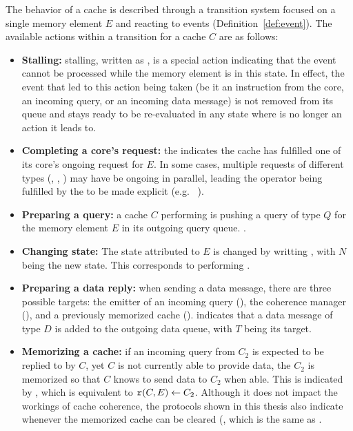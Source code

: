 The behavior of a cache is described through a transition system focused on a
single memory element $E$ and reacting to events (Definition~\ref{def:event}).
The available actions within a transition for a cache $C$ are as follows:
\begin{itemize}
\item \textbf{Stalling:}
   stalling, written as \stallact{}, is a special action indicating that the
   event cannot be processed while the memory element is in this state. In
   effect, the event that led to this action being taken (be it an instruction
   from the core, an incoming query, or an incoming data message) is not
   removed from its queue and stays ready to be re-evaluated in any state where
   \stallact{} is no longer an action it leads to.

\item \textbf{Completing a core's request:}
   the \hitact{} indicates the cache has fulfilled one of its core's ongoing
   request for $E$. In some cases, multiple requests of different types
   (\loadinstr{}, \storeinstr{}, \evictinstr{}) may have be ongoing in
   parallel, leading the operator being fulfilled by the \hitact{} to be made
   explicit (e.g.~\storeinstr{} \hitact{}).

\item \textbf{Preparing a query:}
   a cache $C$ performing  is pushing a query of type $Q$ for
   the memory element $E$ in its outgoing query queue.
   .

\item \textbf{Changing state:}
   The state attributed to $E$ is changed by writting , with
   $N$ being the new state. This corresponds to performing
   .

\item \textbf{Preparing a data reply:}
   when sending a data message, there are three possible targets: the emitter
   of an incoming query (\sendertarget{}), the coherence manager
   (\memorytarget{}), and a previously memorized cache (\replytotarget{}).
    indicates that a data message of type $D$ is added to
   the outgoing data queue, with $T$ being its target.

\item \textbf{Memorizing a cache:}
   if an incoming query from $C_2$ is expected to be replied to by $C$, yet $C$
   is not currently able to provide data, the $C_2$ is memorized so that $C$
   knows to send data to $C_2$ when able. This is indicated by
   \storereplytoact{}, which is equivalent to $\text{\texttt{r}}{}(C,
   E) \gets C_2$. Although it does not impact the workings of cache coherence, the
   protocols shown in this thesis also indicate whenever the memorized cache
   can be cleared (\resetreplytoact{}, which is the same as
   .
\end{itemize}


